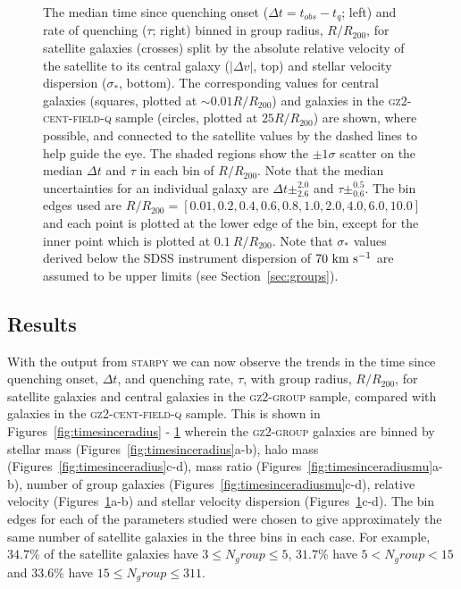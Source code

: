 \documentclass[useAMS,usenatbib]{mn2e}
\begin{document}
\begin{figure}
{\caption[Trend of $\Delta t$ and $\tau$ with group radius split by relative velocity and stellar velocity dispersion]{The median time since quenching onset ($\Delta t = t_{obs} - t_{q}$; left) and rate of quenching ($\tau$; right) binned in group radius, $R/R_{200}$, for satellite galaxies (crosses) split by the absolute relative velocity of the satellite to its central galaxy ($|\Delta v|$, top) and stellar velocity dispersion ($\sigma_*$, bottom). The corresponding values for central galaxies (squares, plotted at $\sim0.01 R/R_{200}$) and galaxies in the \textsc{gz2-cent-field-q} sample (circles, plotted at $25 R/R_{200}$) are shown, where possible, and connected to the satellite values by the dashed lines to help guide the eye. The shaded regions show the $\pm1\sigma$ scatter on the median $\Delta t$ and $\tau$ in each bin of $R/R_{200}$. Note that the median uncertainties for an individual galaxy are $\Delta t\pm_{2.6}^{2.0}$ and $\tau\pm_{0.6}^{0.5}$. The bin edges used are $R/R_{200} =  [0.01 ,   0.2,   0.4,   0.6,   0.8,   1.0 ,   2.0 ,   4.0 ,   6.0 ,  10.0]$ and each point is plotted at the lower edge of the bin, except for the inner point which is plotted at $0.1~R/R_{200}$. Note that $\sigma_*$ values derived below the SDSS instrument dispersion of $70~\rm{km}~\rm{s}^{-1}$ are assumed to be upper limits (see Section~\ref{sec:groups}).}
\label{fig:timesinceradiusvel}}
\end{figure}


\subsection{Results}\label{sec:resultssfhs}

With the output from \textsc{starpy} we can now observe the trends in the time since quenching onset, $\Delta t$, and quenching rate, $\tau$, with group radius, $R/R_{200}$, for satellite galaxies and central galaxies in the \textsc{gz2-group} sample, compared with galaxies in the \textsc{gz2-cent-field-q} sample. This is shown in Figures~\ref{fig:timesinceradius} - \ref{fig:timesinceradiusvel} wherein the \textsc{gz2-group} galaxies are binned by stellar mass (Figures~\ref{fig:timesinceradius}a-b), halo mass (Figures~\ref{fig:timesinceradius}c-d), mass ratio (Figures~\ref{fig:timesinceradiusmu}a-b), number of group galaxies (Figures~\ref{fig:timesinceradiusmu}c-d), relative velocity (Figures~\ref{fig:timesinceradiusvel}a-b) and stellar velocity dispersion (Figures~\ref{fig:timesinceradiusvel}c-d). The bin edges for each of the parameters studied were chosen to give approximately the same number of satellite galaxies in the three bins in each case. For example, $34.7\%$ of the satellite galaxies have $3 \leq N_group \leq 5$, $31.7\%$ have $5 < N_group < 15$ and $33.6\%$ have $15 \leq N_group \leq 311$. 
\end{document}

